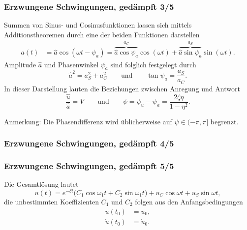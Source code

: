 \documentclass[hyperref={pdfpagemode=FullScreen, colorlinks=false}]{beamer}
\begin{document}
\begin{frame}
\frametitle{Erzwungene Schwingungen, {\normalsize gedämpft 3/5}}
Summen von Sinus- und Cosinusfunktionen lassen sich mittels
Additionstheoremen durch eine der beiden Funktionen darstellen
\begin{align*}
a(t)&= \hat{a}\cos(\omega t - \psi_a) = 
 \overbrace{\hat{a}\cos\psi_a}^{a_C} \cos(\omega t) +
 \overbrace{\hat{a}\sin\psi_a}^{a_S} \sin(\omega t).%
 \end{align*}
 Amplitude $\hat{a}$ und Phasenwinkel $\psi_a$ sind folglich festgelegt durch
 \begin{equation*}
  \hat{a}^2 = a_S^2+a_C^2 \qquad \text{und} \qquad
  \tan\psi_a = \frac{a_S}{a_C}. 
\end{equation*}
In dieser Darstellung lauten die Beziehungen zwischen Anregung und Antwort
\begin{equation*}
\frac{\hat{u}}{\hat{a}}=V \qquad \text{und} \qquad
\psi=\psi_u -\psi_a =  \frac{2\zeta\eta}{1-\eta^2}.
\end{equation*}

Anmerkung: Die Phasendifferenz wird üblicherweise auf $\psi\in(-\pi,\pi]$ begrenzt.
\end{frame}


\begin{frame}
\frametitle{Erzwungene Schwingungen, {\normalsize gedämpft 4/5}}




\end{frame}

\begin{frame}
\frametitle{Erzwungene Schwingungen, {\normalsize gedämpft 5/5}}
Die Gesamtlösung lautet
\begin{equation*}
 u(t)=e^{-\delta t}\bigl( C_1\cos\omega_1 t + C_2\sin\omega_1 t \bigr)
 +u_C\cos\omega t + u_S\sin\omega t,
\end{equation*}
die unbestimmten Koeffizienten $C_1$ und $C_2$ folgen aus den Anfangsbedingungen
\begin{align*}
 u(t_0)&=u_0,\\
 \dot{u}(t_0)&=\dot{u}_0.
\end{align*}
\end{frame}
\end{document}
